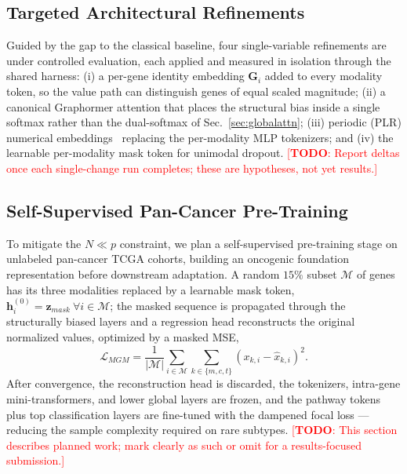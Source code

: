 \documentclass[10pt, twocolumn]{article}
\newcommand{\todo}[1]{\textcolor{red}{[\textbf{TODO}: #1]}}
\begin{document}
\subsection{Targeted Architectural Refinements}
Guided by the gap to the classical baseline, four single-variable refinements are
under controlled evaluation, each applied and measured in isolation through the
shared harness: (i) a per-gene identity embedding $\mathbf{G}_i$ added to every
modality token, so the value path can distinguish genes of equal scaled magnitude;
(ii) a canonical Graphormer attention that places the structural bias inside a
single softmax rather than the dual-softmax of Sec.~\ref{sec:globalattn}; (iii)
periodic (PLR) numerical embeddings~\cite{gorishniy2022} replacing the per-modality
MLP tokenizers; and (iv) the learnable per-modality mask token for unimodal
dropout. \todo{Report deltas once each single-change run completes; these are
hypotheses, not yet results.}

\subsection{Self-Supervised Pan-Cancer Pre-Training}
To mitigate the $N \ll p$ constraint, we plan a self-supervised pre-training stage
on unlabeled pan-cancer TCGA cohorts, building an oncogenic foundation
representation before downstream adaptation. A random $15\%$ subset $\mathcal{M}$
of genes has its three modalities replaced by a learnable mask token,
$\mathbf{h}_i^{(0)} = \mathbf{z}_{mask}\ \forall i \in \mathcal{M}$; the masked
sequence is propagated through the structurally biased layers and a regression head
reconstructs the original normalized values, optimized by a masked MSE,
\begin{equation}
    \mathcal{L}_{MGM} = \frac{1}{|\mathcal{M}|} \sum_{i \in \mathcal{M}}
    \sum_{k \in \{m,c,t\}} \left( x_{k,i} - \hat{x}_{k,i} \right)^2.
\end{equation}
After convergence, the reconstruction head is discarded, the tokenizers,
intra-gene mini-transformers, and lower global layers are frozen, and the pathway
tokens plus top classification layers are fine-tuned with the dampened focal loss
--- reducing the sample complexity required on rare subtypes. \todo{This section
describes planned work; mark clearly as such or omit for a results-focused
submission.}

\end{document}
